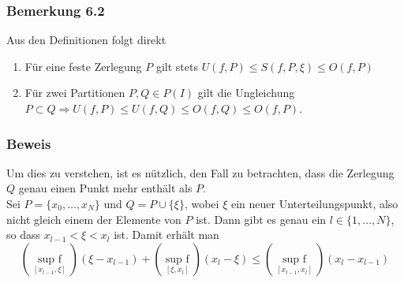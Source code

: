 \subsubsection*{Bemerkung 6.2}
Aus den Definitionen folgt direkt
\begin{enumerate}[\indent a)]
\item Für eine feste Zerlegung $P$ gilt stets $U(f,P) \leq S(f,P,\xi) \leq O(f,P)$
\item Für zwei Partitionen $P,Q \in P(I)$ gilt die Ungleichung $P\subset Q \Rightarrow U(f,P) \leq U(f,Q) \leq O(f,Q)\leq O(f,P)$.
\end{enumerate}

\subsubsection*{Beweis}
Um dies zu verstehen, ist es nützlich, den Fall zu betrachten, dass die Zerlegung $Q$ genau einen Punkt mehr enthält als $P$.\\

Sei $P=\{x_0,\dots ,x_N\}$ und $Q=P\cup \{\xi\}$, wobei $\xi$ ein neuer Unterteilungspunkt, also nicht gleich einem der Elemente von $P$ ist. Dann gibt es genau ein $l\in \{ 1,\dots,N\}$, so dass $x_{l-1}<\xi <x_l$ ist. Damit erhält man \[(\mathop {\sup {\text{ }}f}\limits_{[{x_{l - 1}},\xi ]} )(\xi  - {x_{l - 1}}) + (\mathop {\sup {\text{ }}f}\limits_{[\xi ,{x_l}]} )({x_l} - \xi ) \le (\mathop {\sup {\text{ }}f}\limits_{[{x_{l - 1}},{x_l}]} )({x_l} - {x_{l - 1}})\]


\begin{center}
\end{center}


